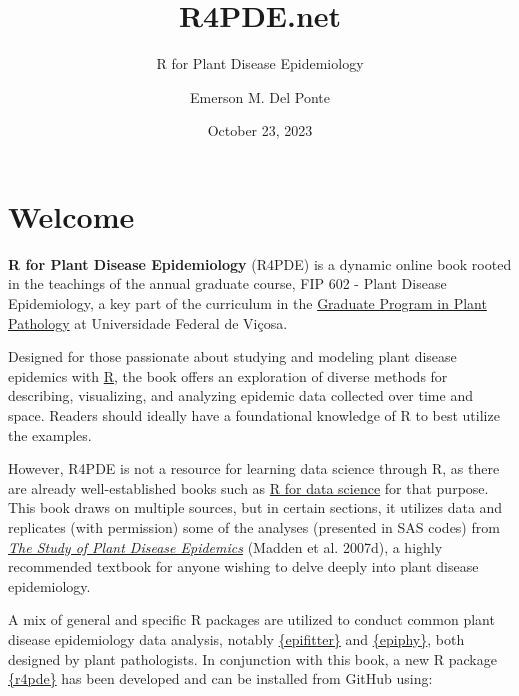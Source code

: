 \documentclass[
  letterpaper,
]{book}
\title{R4PDE.net}
\subtitle{R for Plant Disease Epidemiology}
\author{Emerson M. Del Ponte}
\date{October 23, 2023}
\renewcommand*\contentsname{Table of contents}
\newcommand\contentsname{Table of contents}
\begin{document}
\frontmatter
\maketitle
\ifdefined\Shaded\renewenvironment{Shaded}{\begin{tcolorbox}[enhanced, boxrule=0pt, borderline west={3pt}{0pt}{shadecolor}, breakable, interior hidden, sharp corners, frame hidden]}{\end{tcolorbox}}\fi

\renewcommand*\contentsname{Table of contents}
{
\setcounter{tocdepth}{2}
\tableofcontents
}
\mainmatter
{}

\hypertarget{welcome}{%
\chapter*{Welcome}\label{welcome}}


\textbf{R for Plant Disease Epidemiology} (R4PDE) is a dynamic online
book rooted in the teachings of the annual graduate course, FIP 602 -
Plant Disease Epidemiology, a key part of the curriculum in the
\href{http://www.dfp.ufv.br/grad/}{Graduate Program in Plant Pathology}
at Universidade Federal de Viçosa.

Designed for those passionate about studying and modeling plant disease
epidemics with \href{https://www.r-project.org/}{R}, the book offers an
exploration of diverse methods for describing, visualizing, and
analyzing epidemic data collected over time and space. Readers should
ideally have a foundational knowledge of R to best utilize the examples.

However, R4PDE is not a resource for learning data science through R, as
there are already well-established books such as
\href{https://r4ds.had.co.nz/}{R for data science} for that purpose.
This book draws on multiple sources, but in certain sections, it
utilizes data and replicates (with permission) some of the analyses
(presented in SAS codes) from
\href{https://apsjournals.apsnet.org/doi/book/10.1094/9780890545058}{\emph{The
Study of Plant Disease Epidemics}} (Madden et al. 2007d), a highly
recommended textbook for anyone wishing to delve deeply into plant
disease epidemiology.

A mix of general and specific R packages are utilized to conduct common
plant disease epidemiology data analysis, notably
\href{https://alvesks.github.io/epifitter/}{\{epifitter\}} and
\href{https://chgigot.github.io/epiphy/}{\{epiphy\}}, both designed by
plant pathologists. In conjunction with this book, a new R package
\href{https://github.com/emdelponte/r4pde}{\{r4pde\}} has been developed
and can be installed from GitHub using:
\end{document}
